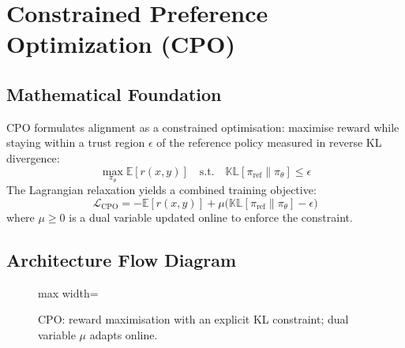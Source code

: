 \documentclass{article}
\begin{document}
\newpage
\section{Constrained Preference Optimization (CPO)}

\subsection{Mathematical Foundation}
CPO formulates alignment as a constrained optimisation: maximise reward while staying within a trust region $\epsilon$ of the reference policy measured in reverse KL divergence:
\begin{equation}
  \max_{\pi_\theta} \mathbb{E}[r(x,y)] \quad \text{s.t.} \quad \mathbb{KL}[\pi_{\text{ref}} \| \pi_\theta] \leq \epsilon
\end{equation}
The Lagrangian relaxation yields a combined training objective:
\begin{equation}
  \mathcal{L}_{\text{CPO}} = -\mathbb{E}[r(x,y)] + \mu\bigl(\mathbb{KL}[\pi_{\text{ref}} \| \pi_\theta] - \epsilon\bigr)
\end{equation}
where $\mu \geq 0$ is a dual variable updated online to enforce the constraint.

\subsection{Architecture Flow Diagram}

\begin{figure}[h]
\centering
\begin{adjustbox}{max width=\linewidth}
\end{adjustbox}
\caption{CPO: reward maximisation with an explicit KL constraint; dual variable $\mu$ adapts online.}
\end{figure}
\end{document}
